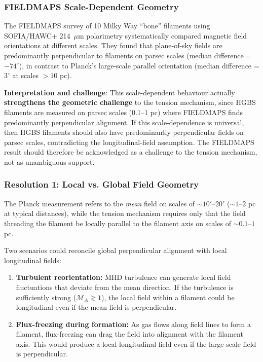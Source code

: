 \documentclass[11pt,a4paper]{article}
\begin{document}
\subsubsection{FIELDMAPS Scale-Dependent Geometry}

The FIELDMAPS survey of 10 Milky Way ``bone'' filaments \citep{Coude2025} using SOFIA/HAWC+ 214~$\mu$m polarimetry systematically compared magnetic field orientations at different scales. They found that plane-of-sky fields are predominantly perpendicular to filaments on parsec scales (median difference = $-74^{\circ}$), in contrast to Planck's large-scale parallel orientation (median difference = $3^{\circ}$ at scales $>10$ pc).

\textbf{Interpretation and challenge}: This scale-dependent behaviour actually \textbf{strengthens the geometric challenge} to the tension mechanism, since HGBS filaments are measured on parsec scales (0.1--1 pc) where FIELDMAPS finds predominantly perpendicular alignment. If this scale-dependence is universal, then HGBS filaments should also have predominantly perpendicular fields on parsec scales, contradicting the longitudinal-field assumption. The FIELDMAPS result should therefore be acknowledged as a challenge to the tension mechanism, not as unambiguous support.

\subsubsection{Resolution 1: Local vs. Global Field Geometry}

The Planck measurement refers to the \emph{mean} field on scales of $\sim 10'$--$20'$ ($\sim 1$--$2$ pc at typical distances), while the tension mechanism requires only that the field threading the filament be locally parallel to the filament axis on scales of $\sim 0.1$--$1$ pc.

Two scenarios could reconcile global perpendicular alignment with local longitudinal fields:
\begin{enumerate}
    \item \textbf{Turbulent reorientation:} MHD turbulence can generate local field fluctuations that deviate from the mean direction. If the turbulence is sufficiently strong ($\mathcal{M}_A \gtrsim 1$), the local field within a filament could be longitudinal even if the mean field is perpendicular.
    \item \textbf{Flux-freezing during formation:} As gas flows along field lines to form a filament, flux-freezing can drag the field into alignment with the filament axis. This would produce a local longitudinal field even if the large-scale field is perpendicular.
\end{enumerate}
\end{document}
